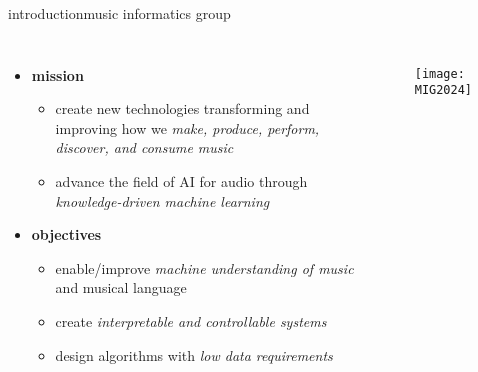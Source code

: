 \begin{frame}{introduction}{music informatics group}
    \vspace{-5mm}
    \begin{columns}
    \begin{itemize}
        \item   \textbf{mission}
            \begin{itemize}
                \item   create new technologies transforming and improving how we \textit{make, produce, perform, discover, and consume music}
                \item   advance the field of AI for audio through \textit{knowledge-driven machine learning}
            \end{itemize}
        \bigskip
        \item   \textbf{objectives}
            \begin{itemize}
                \item   enable/improve \textit{machine understanding of music} and musical language
                \item   create \textit{interpretable and controllable systems}
                \item   design algorithms with \textit{low data requirements}
            \end{itemize}
    \end{itemize}
        \vspace{12mm}\begin{figure}%
            \texttt{[image: MIG2024]}%
        \end{figure}
    \end{columns}
\end{frame}
